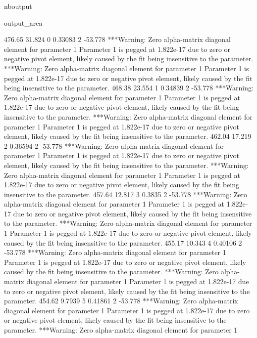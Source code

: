 \documentclass[letterpaper,10pt,english]{sphinxmanual}
\begin{document}
\begin{sphinxuseclass}{nboutput}
{\begin{sphinxuseclass}{output_area}
\begin{sphinxuseclass}{}
\begin{sphinxVerbatim}[commandchars=\\\{\}]
          476.65      31.824    0     0.33083    2     -53.778
***Warning: Zero alpha-matrix diagonal element for parameter 1
 Parameter 1 is pegged at 1.822e-17 due to zero or negative pivot element, likely
 caused by the fit being insensitive to the parameter.
***Warning: Zero alpha-matrix diagonal element for parameter 1
 Parameter 1 is pegged at 1.822e-17 due to zero or negative pivot element, likely
 caused by the fit being insensitive to the parameter.
          468.38      23.554    1     0.34839    2     -53.778
***Warning: Zero alpha-matrix diagonal element for parameter 1
 Parameter 1 is pegged at 1.822e-17 due to zero or negative pivot element, likely
 caused by the fit being insensitive to the parameter.
***Warning: Zero alpha-matrix diagonal element for parameter 1
 Parameter 1 is pegged at 1.822e-17 due to zero or negative pivot element, likely
 caused by the fit being insensitive to the parameter.
          462.04      17.219    2     0.36594    2     -53.778
***Warning: Zero alpha-matrix diagonal element for parameter 1
 Parameter 1 is pegged at 1.822e-17 due to zero or negative pivot element, likely
 caused by the fit being insensitive to the parameter.
***Warning: Zero alpha-matrix diagonal element for parameter 1
 Parameter 1 is pegged at 1.822e-17 due to zero or negative pivot element, likely
 caused by the fit being insensitive to the parameter.
          457.64      12.817    3      0.3835    2     -53.778
***Warning: Zero alpha-matrix diagonal element for parameter 1
 Parameter 1 is pegged at 1.822e-17 due to zero or negative pivot element, likely
 caused by the fit being insensitive to the parameter.
***Warning: Zero alpha-matrix diagonal element for parameter 1
 Parameter 1 is pegged at 1.822e-17 due to zero or negative pivot element, likely
 caused by the fit being insensitive to the parameter.
          455.17      10.343    4     0.40106    2     -53.778
***Warning: Zero alpha-matrix diagonal element for parameter 1
 Parameter 1 is pegged at 1.822e-17 due to zero or negative pivot element, likely
 caused by the fit being insensitive to the parameter.
***Warning: Zero alpha-matrix diagonal element for parameter 1
 Parameter 1 is pegged at 1.822e-17 due to zero or negative pivot element, likely
 caused by the fit being insensitive to the parameter.
          454.62      9.7939    5     0.41861    2     -53.778
***Warning: Zero alpha-matrix diagonal element for parameter 1
 Parameter 1 is pegged at 1.822e-17 due to zero or negative pivot element, likely
 caused by the fit being insensitive to the parameter.
***Warning: Zero alpha-matrix diagonal element for parameter 1

\end{sphinxVerbatim}
\end{sphinxuseclass}
\end{sphinxuseclass}}
\end{sphinxuseclass}
\end{document}

